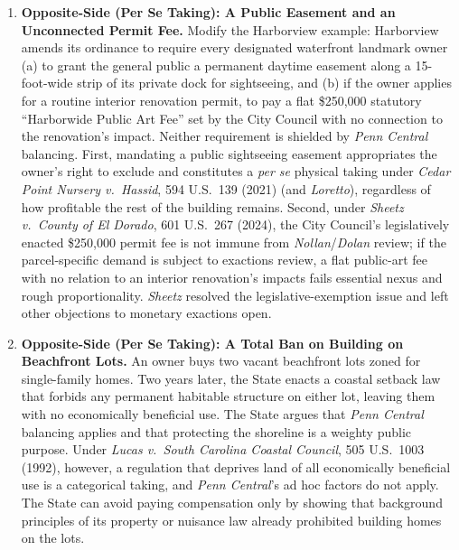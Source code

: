 \documentclass[12pt]{article}
\begin{document}
\begin{enumerate}
\item \textbf{Opposite-Side (Per Se Taking): A Public Easement and an Unconnected Permit Fee.} Modify the Harborview example: Harborview amends its ordinance to require every designated waterfront landmark owner (a) to grant the general public a permanent daytime easement along a 15-foot-wide strip of its private dock for sightseeing, and (b) if the owner applies for a routine interior renovation permit, to pay a flat \$250,000 statutory ``Harborwide Public Art Fee'' set by the City Council with no connection to the renovation's impact. Neither requirement is shielded by \textit{Penn Central} balancing. First, mandating a public sightseeing easement appropriates the owner's right to exclude and constitutes a \textit{per se} physical taking under \textit{Cedar Point Nursery v.\ Hassid}, 594 U.S.\ 139 (2021) (and \textit{Loretto}), regardless of how profitable the rest of the building remains. Second, under \textit{Sheetz v.\ County of El Dorado}, 601 U.S.\ 267 (2024), the City Council's legislatively enacted \$250,000 permit fee is not immune from \textit{Nollan}/\textit{Dolan} review; if the parcel-specific demand is subject to exactions review, a flat public-art fee with no relation to an interior renovation's impacts fails essential nexus and rough proportionality. \textit{Sheetz} resolved the legislative-exemption issue and left other objections to monetary exactions open.

\item \textbf{Opposite-Side (Per Se Taking): A Total Ban on Building on Beachfront Lots.} An owner buys two vacant beachfront lots zoned for single-family homes. Two years later, the State enacts a coastal setback law that forbids any permanent habitable structure on either lot, leaving them with no economically beneficial use. The State argues that \textit{Penn Central} balancing applies and that protecting the shoreline is a weighty public purpose. Under \textit{Lucas v.\ South Carolina Coastal Council}, 505 U.S.\ 1003 (1992), however, a regulation that deprives land of all economically beneficial use is a categorical taking, and \textit{Penn Central}'s ad hoc factors do not apply. The State can avoid paying compensation only by showing that background principles of its property or nuisance law already prohibited building homes on the lots.


\end{enumerate}
\end{document}
